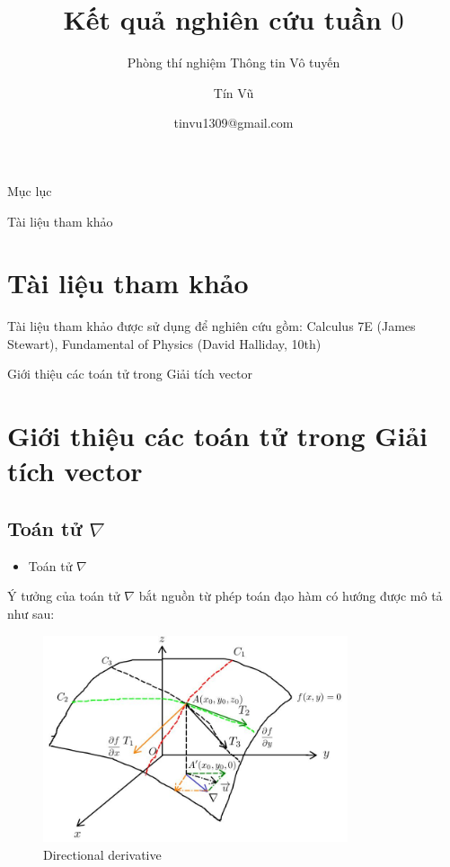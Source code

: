 \documentclass[8pt]{beamer}
\title[Kết quả nghiên cứu tuần 0]
{Kết quả nghiên cứu tuần $0$}
\subtitle{Phòng thí nghiệm Thông tin Vô tuyến}
\author[Phòng thí nghiệm thông tin Vô tuyến]
{Tín Vũ}
\date[VLC 2021] %
{tinvu1309@gmail.com}
\begin{document}
\frame{\titlepage}
\begin{frame}{Mục lục}
\tableofcontents
\end{frame}
\begin{frame}{Tài liệu tham khảo}
\section{Tài liệu tham khảo}
Tài liệu tham khảo được sử dụng để nghiên cứu gồm: Calculus 7E (James Stewart), Fundamental of Physics (David Halliday, 10th)
\end{frame}
\begin{frame}{Giới thiệu các toán tử trong Giải tích vector}
\section{Giới thiệu các toán tử trong Giải tích vector}
\subsection{Toán tử $\nabla$}
\begin{itemize}
\item Toán tử $\nabla$
\end{itemize}
Ý tưởng của toán tử $\nabla$  bắt nguồn từ phép toán đạo hàm có hướng được mô tả như sau:
\begin{figure}[h]
			\includegraphics[width=0.8\textwidth]{nabla1.jpg}
			\caption{Directional derivative}			\label{fig:re1}
\end{figure}
\end{frame}
\end{document}
